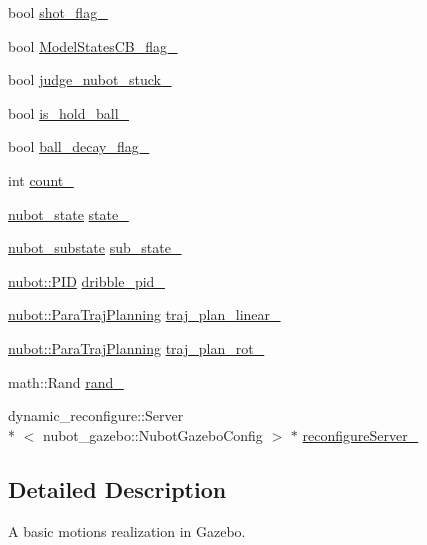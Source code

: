 \begin{DoxyCompactItemize}
bool \hyperlink{classgazebo_1_1NubotGazebo_a85d5357dfacc73801bed752d6dc297d4}{shot\-\_\-flag\-\_\-}
\item 
bool \hyperlink{classgazebo_1_1NubotGazebo_ae7c8ddd9342426222c1354740b23a01d}{Model\-States\-C\-B\-\_\-flag\-\_\-}
\item 
bool \hyperlink{classgazebo_1_1NubotGazebo_a6392423c1aaf2ba68aac9eeb318f9e5b}{judge\-\_\-nubot\-\_\-stuck\-\_\-}
\item 
bool \hyperlink{classgazebo_1_1NubotGazebo_a0d63b5e7f3d213fca30bbe09bd15e114}{is\-\_\-hold\-\_\-ball\-\_\-}
\item 
bool \hyperlink{classgazebo_1_1NubotGazebo_a51c8eaa9e931b22700f6c000e413bfa2}{ball\-\_\-decay\-\_\-flag\-\_\-}
\item 
int \hyperlink{classgazebo_1_1NubotGazebo_afbdb7428487c2f6dec5000bae3d6f5a7}{count\-\_\-}
\item 
\hyperlink{nubot__gazebo_8hh_a9f17572284bab3e9bd067a6393a7953b}{nubot\-\_\-state} \hyperlink{classgazebo_1_1NubotGazebo_acf9828d7b8b37440a8e45ef63895ec8b}{state\-\_\-}
\item 
\hyperlink{nubot__gazebo_8hh_a503a2f01f9f49bd293d3c44faf21b528}{nubot\-\_\-substate} \hyperlink{classgazebo_1_1NubotGazebo_a8db3f4b9767b4ec34716756f02fb7fe9}{sub\-\_\-state\-\_\-}
\item 
\hyperlink{classnubot_1_1PID}{nubot\-::\-P\-I\-D} \hyperlink{classgazebo_1_1NubotGazebo_a5865f8d5f7aad90ace72fe2942b6d25e}{dribble\-\_\-pid\-\_\-}
\item 
\hyperlink{classnubot_1_1ParaTrajPlanning}{nubot\-::\-Para\-Traj\-Planning} \hyperlink{classgazebo_1_1NubotGazebo_ac16bd419aba2826c0227ac575b351e9e}{traj\-\_\-plan\-\_\-linear\-\_\-}
\item 
\hyperlink{classnubot_1_1ParaTrajPlanning}{nubot\-::\-Para\-Traj\-Planning} \hyperlink{classgazebo_1_1NubotGazebo_a95c171c478be4aadf6b4d96a3d3a48c8}{traj\-\_\-plan\-\_\-rot\-\_\-}
\item 
math\-::\-Rand \hyperlink{classgazebo_1_1NubotGazebo_a5a6b999a205a45e1778e0f4d75e325e0}{rand\-\_\-}
\item 
dynamic\-\_\-reconfigure\-::\-Server\\*
$<$ nubot\-\_\-gazebo\-::\-Nubot\-Gazebo\-Config $>$ $\ast$ \hyperlink{classgazebo_1_1NubotGazebo_a6f892f9dcb5b46bdd232ffec277dd093}{reconfigure\-Server\-\_\-}
\end{DoxyCompactItemize}


\subsection{Detailed Description}
A basic motions realization in Gazebo. 

